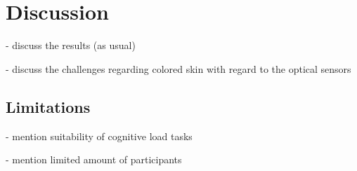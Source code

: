 \section{Discussion}



- discuss the results (as usual)

- discuss the challenges regarding colored skin with regard to the optical sensors


\subsection{Limitations}


 
- mention suitability of cognitive load tasks 

- mention limited amount of participants

